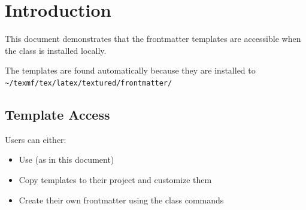 \documentclass[12pt,a4paper]{textured}
\begin{document}
\frontmatter





\tableofcontents

\mainmatter

\chapter{Introduction}

This document demonstrates that the frontmatter templates are accessible
when the class is installed locally.

The templates are found automatically because they are installed to
\texttt{\textasciitilde/texmf/tex/latex/textured/frontmatter/}

\section{Template Access}

Users can either:
\begin{itemize}
  \item Use \verb|| (as in this document)
  \item Copy templates to their project and customize them
  \item Create their own frontmatter using the class commands
\end{itemize}

\end{document}
